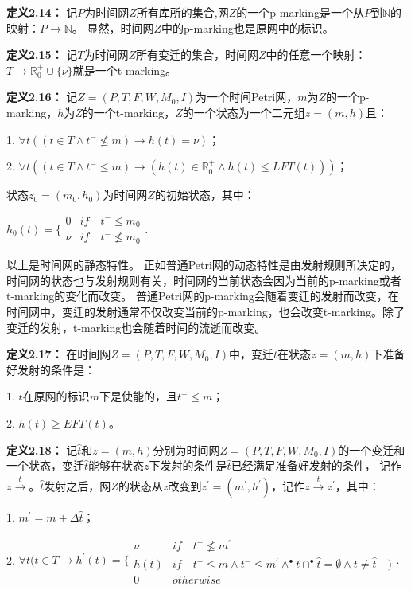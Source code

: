     \textbf{定义2.14}\cite{2013Time}\textbf{：}
    记$P$为时间网$Z$所有库所的集合,网$Z$的一个p-marking是一个从$P$到$\mathbb{N}$的映射：$P \rightarrow \mathbb{N}$。
    显然，时间网$Z$中的p-marking也是原网中的标识。

    \textbf{定义2.15}\cite{2013Time}\textbf{：}
    记$T$为时间网$Z$所有变迁的集合，时间网$Z$中的任意一个映射：$T \rightarrow \mathbb{R}_{0}^{+} \cup \{\nu\}$就是一个t-marking。

    \textbf{定义2.16}\cite{2013Time}\textbf{：}
    记$Z=(P,T,F,W,M_{0},I)$为一个时间Petri网，$m$为$Z$的一个p-marking，$h$为$Z$的一个t-marking，$Z$的一个状态为一个二元组$z=(m,h)$且：

    1. $\forall t ((t \in T \wedge t^{-} \nleq m) \rightarrow h(t) = \nu)$；

    2. $\forall t ((t \in T \wedge t^{-} \leq m) \rightarrow (h(t) \in \mathbb{R}_{0}^{+} \wedge h(t) \leq LFT(t)))$；

    状态$z_{0}=(m_{0},h_{0})$为时间网$Z$的初始状态，其中：

    $h_{0}(t)= \bigg \{\begin{array}{ll}
    0 & if \quad t^{-} \leq m_{0} \\
    \nu & if \quad t^{-} \nleq m_{0}
    \end{array}.$

    以上是时间网的静态特性。
    正如普通Petri网的动态特性是由发射规则所决定的，时间网的状态也与发射规则有关，时间网的当前状态会因为当前的p-marking或者t-marking的变化而改变。
    普通Petri网的p-marking会随着变迁的发射而改变，在时间网中，变迁的发射通常不仅改变当前的p-marking，也会改变t-marking。除了变迁的发射，t-marking也会随着时间的流逝而改变。

    \textbf{定义2.17}\cite{2013Time}\textbf{：}
    在时间网$Z=(P,T,F,W,M_{0},I)$中，变迁$t$在状态$z=(m,h)$下准备好发射的条件是：

    1. $t$在原网的标识$m$下是使能的，且$t^{-} \leq m$；

    2. $h(t) \geq EFT(t)$。

    \textbf{定义2.18}\cite{2013Time}\textbf{：}
    记$\hat{t}$和$z=(m,h)$分别为时间网$Z=(P,T,F,W,M_{0},I)$的一个变迁和一个状态，变迁$\hat{t}$能够在状态$z$下发射的条件是$\hat{t}$已经满足准备好发射的条件，
    记作$z \stackrel{\hat{t}}{\longrightarrow} $。$\hat{t}$发射之后，网$Z$的状态从$z$改变到$z^{'}=(m^{'},h^{'})$，记作$z \stackrel{\hat{t}}{\longrightarrow} z^{'}$，其中：

    1. $m^{'}=m+ \Delta \hat{t}$；

    2. $\forall t (t \in T \longrightarrow h^{'}(t)= \bigg \{\begin{array}{ll}
    \nu & if \quad t^{-} \nleq m^{'} \\
    h(t) & if \quad t^{-} \leq m \wedge t^{-} \leq m^{'} \wedge ^{\bullet}t \cap ^{\bullet}\hat{t} = \emptyset \wedge t \neq \hat{t} \quad )\\
    0 & otherwise
    \end{array}.$

